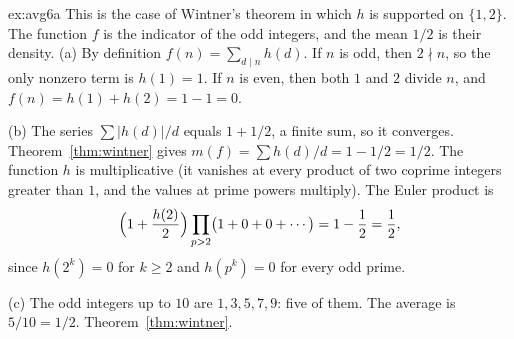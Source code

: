 \begin{solution}{ex:avg6a}
\idea This is the case of Wintner's theorem in which $h$ is supported on $\{1,2\}$. The function $f$ is the indicator of the odd integers, and the mean $1/2$ is their density.
\writeup (a) By definition $f(n)=\sum_{d\mid n}h(d)$. If $n$ is odd, then $2\nmid n$, so the only nonzero term is $h(1)=1$. If $n$ is even, then both $1$ and $2$ divide $n$, and $f(n)=h(1)+h(2)=1-1=0$.

(b) The series $\sum|h(d)|/d$ equals $1+1/2$, a finite sum, so it converges. Theorem~\ref{thm:wintner} gives $m(f)=\sum h(d)/d=1-1/2=1/2$. The function $h$ is multiplicative (it vanishes at every product of two coprime integers greater than $1$, and the values at prime powers multiply). The Euler product is
\[
\Bigl(1+\frac{h(2)}2\Bigr)\prod_{p>2}\bigl(1+0+0+\cdots\bigr)=1-\frac12=\frac12,
\]
since $h(2^k)=0$ for $k\ge2$ and $h(p^k)=0$ for every odd prime.

(c) The odd integers up to $10$ are $1,3,5,7,9$: five of them. The average is $5/10=1/2$.
\tools Theorem~\ref{thm:wintner}.
\end{solution}

